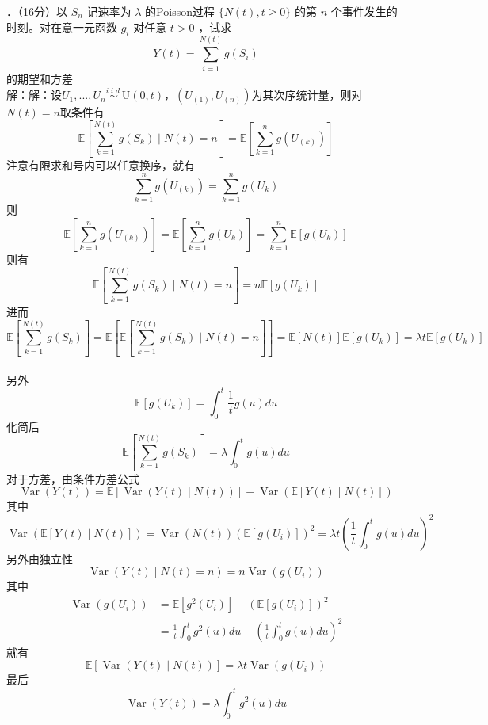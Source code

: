 \documentclass[UTF8,openany]{book}
\begin{document}
．（16分）以 $S_{n}$ 记速率为 $\lambda$ 的Poisson过程 $\{N(t), t \geq 0\}$ 的第 $n$ 个事件发生的时刻。对在意一元函数 $g_{i}$ 对任意 $t>0$ ，试求
$$
Y(t)=\sum_{i=1}^{N(t)} g\left(S_{i}\right)
$$
的期望和方差\\
解：解：设$U_1,...,U_n\stackrel{i.i.d.}{\sim }\mathrm{U}(0,t)$，$(U_{(1)},U_{(n)})$为其次序统计量，则对$N(t)=n$取条件有
\[
\mathbb{E}\left[\sum\limits_{k=1}^{N(t)}  g(S_k) \mid N(t)=n \right]=\mathbb{E}\left[\sum\limits_{k=1}^{n} g (U_{(k)}) \right]
\]
注意有限求和号内可以任意换序，就有
\[
\sum\limits_{k=1}^{n} g (U_{(k)})=\sum\limits_{k=1}^{n} g(U_{k}) 
\]
则
\[
\mathbb{E}\left[\sum\limits_{k=1}^{n} g (U_{(k)}) \right]=\mathbb{E}\left[\sum\limits_{k=1}^{n} g (U_{k}) \right]=\sum\limits_{k=1}^{n}\mathbb{E}\left[g (U_{k}) \right]
\]
则有
\[
\mathbb{E}\left[\sum\limits_{k=1}^{N(t)} g (S_k) \mid N(t)=n \right]=n\mathbb{E}[g(U_k)]
\]
进而
\[
\mathbb{E}\left[\sum\limits_{k=1}^{N(t)} g( S_k ) \right]=\mathbb{E}\left[\mathbb{E}\left[\sum\limits_{k=1}^{N(t)} g( S_k )\mid N(t)=n \right] \right] =\mathbb{E}[N(t)]\mathbb{E}[g(U_k)]=\lambda t\mathbb{E}[g(U_k)]
\]\\
另外
\[
\mathbb{E}[g(U_k)]=\int_{0}^{t} \frac{1}{t} g(u)du
\]
化简后
\[
\mathbb{E}\left[\sum\limits_{k=1}^{N(t)} g( S_k ) \right]=\lambda \int_{0}^{t}  g(u)du
\]
对于方差，由条件方差公式
\[
\operatorname{Var}(Y(t))=\mathbb{E}\left[\operatorname{Var}(Y(t)\mid N(t)) \right] +\operatorname{Var}\left(\mathbb{E}[Y(t)\mid N(t)] \right) 
\]
其中
\[
\operatorname{Var}\left(\mathbb{E}[Y(t)\mid N(t)] \right) =\operatorname{Var}(N(t))\left( \mathbb{E}[g(U_i)]\right)^2=\lambda t \left(\frac{1}{t} \int_{0}^{t} g(u)du \right)^2 
\]
另外由独立性
\[
\operatorname{Var}(Y(t)\mid N(t)=n)=n\operatorname{Var}(g(U_i))
\]
其中
\begin{align*}
	\operatorname{Var}(g(U_i))& = \mathbb{E}[g^2(U_i)]-\left(\mathbb{E}[g(U_i)] \right)^2  \\
	& = \frac{1}{t} \int_{0}^{t} g^2(u)du-\left(\frac{1}{t} \int_{0}^{t} g(u)du \right)^2 
\end{align*}
就有
\[
\mathbb{E}\left[\operatorname{Var}(Y(t)\mid N(t)) \right]=\lambda t \operatorname{Var}(g(U_i))
\]
最后
\[
\operatorname{Var}(Y(t))=\lambda \int_{0}^{t} g^2(u)du
\]\\
\end{document}
